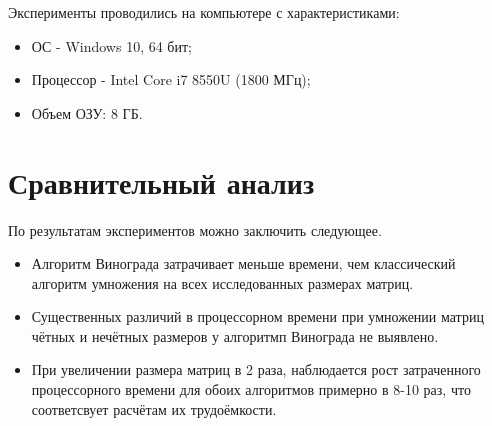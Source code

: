 Эксперименты проводились на компьютере с характеристиками:
\begin{itemize}
	\item ОС - Windows 10, 64 бит;
	\item Процессор -  Intel Core i7 8550U (1800 МГц);
	\item Объем ОЗУ: 8 ГБ.
\end{itemize}

\section*{Сравнительный анализ}
По результатам экспериментов можно заключить следующее.
\begin{itemize}
	\item Алгоритм Винограда затрачивает меньше времени, чем классический алгоритм умножения на всех исследованных размерах матриц.
	\item Существенных различий в процессорном времени при умножении матриц чётных и нечётных размеров у алгоритмп Винограда не выявлено.
	\item При увеличении размера матриц в 2 раза, наблюдается рост затраченного процессорного времени для обоих алгоритмов примерно в 8-10 раз, что соответсвует расчётам их трудоёмкости.
\end{itemize}


	